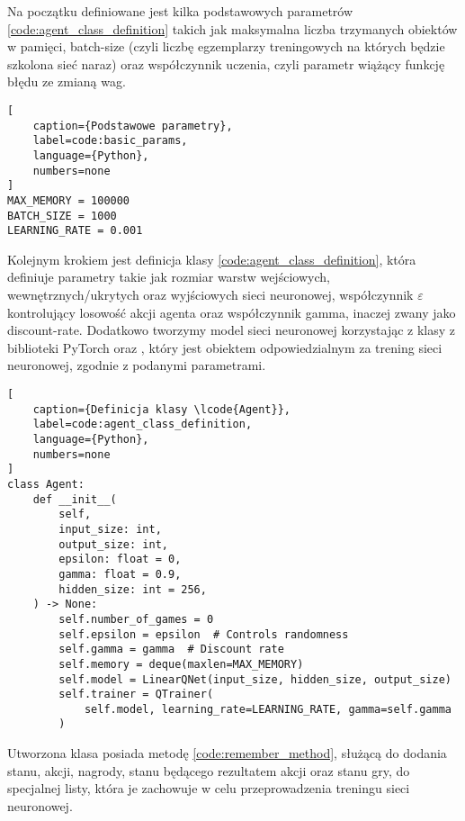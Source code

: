 Na początku definiowane jest kilka podstawowych parametrów \ref{code:agent_class_definition} takich jak maksymalna liczba trzymanych obiektów w pamięci, batch-size \cite{BatchNormalization} (czyli liczbę egzemplarzy treningowych na których będzie szkolona sieć naraz) oraz współczynnik uczenia, czyli parametr wiążący funkcję błędu ze zmianą wag.

\begin{onepage}
    \begin{lstlisting}[
    caption={Podstawowe parametry},
    label=code:basic_params,
    language={Python},
    numbers=none
]
MAX_MEMORY = 100000
BATCH_SIZE = 1000
LEARNING_RATE = 0.001
    \end{lstlisting}
\end{onepage}


Kolejnym krokiem jest definicja klasy  \ref{code:agent_class_definition}, która definiuje parametry takie jak rozmiar warstw wejściowych, wewnętrznych/ukrytych oraz wyjściowych sieci neuronowej, współczynnik $\varepsilon$ kontrolujący losowość akcji agenta oraz współczynnik gamma, inaczej zwany jako discount-rate. Dodatkowo tworzymy model sieci neuronowej  korzystając z klasy  z biblioteki PyTorch oraz , który jest obiektem odpowiedzialnym za trening sieci neuronowej, zgodnie z podanymi parametrami.

\begin{onepage}
    \begin{lstlisting}[
    caption={Definicja klasy \lcode{Agent}},
    label=code:agent_class_definition,
    language={Python},
    numbers=none
]
class Agent:
    def __init__(
        self,
        input_size: int,
        output_size: int,
        epsilon: float = 0,
        gamma: float = 0.9,
        hidden_size: int = 256,
    ) -> None:
        self.number_of_games = 0
        self.epsilon = epsilon  # Controls randomness
        self.gamma = gamma  # Discount rate
        self.memory = deque(maxlen=MAX_MEMORY)
        self.model = LinearQNet(input_size, hidden_size, output_size)
        self.trainer = QTrainer(
            self.model, learning_rate=LEARNING_RATE, gamma=self.gamma
        )
    \end{lstlisting}
\end{onepage}

Utworzona klasa posiada metodę  \ref{code:remember_method}, służącą do dodania stanu, akcji, nagrody, stanu będącego rezultatem akcji oraz stanu gry, do specjalnej listy, która je zachowuje w celu przeprowadzenia treningu sieci neuronowej.


